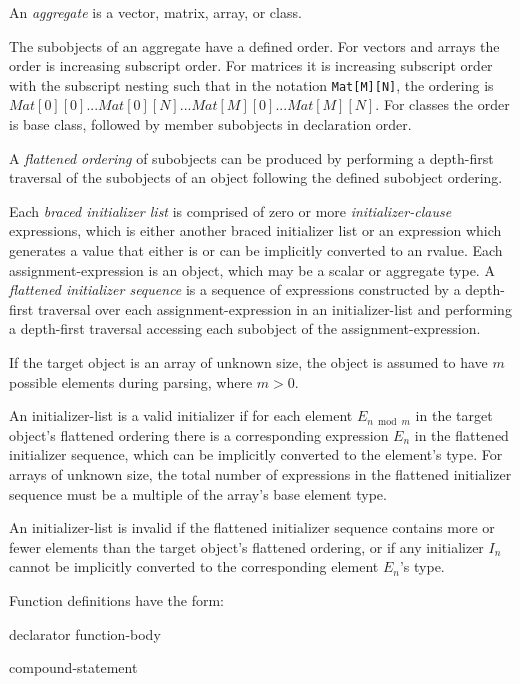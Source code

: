 
\p An \textit{aggregate} is a vector, matrix, array, or class.

\p The subobjects of an aggregate have a defined order. For vectors and arrays
the order is increasing subscript order. For matrices it is increasing subscript
order with the subscript nesting such that in the notation
\texttt{Mat[M][N]}, the ordering is \(Mat[0][0]...Mat[0][N]...
Mat[M][0]...Mat[M][N]\). For classes the order is base class, followed by member
subobjects in declaration order.

\p A \textit{flattened ordering} of subobjects can be produced by performing a
depth-first traversal of the subobjects of an object following the defined
subobject ordering.

\p Each \textit{braced initializer list} is comprised of zero or more
\textit{initializer-clause} expressions, which is either another braced
initializer list or an expression which generates a value that either is or can
be implicitly converted to an rvalue. Each assignment-expression is an object,
which may be a scalar or aggregate type. A \textit{flattened initializer
sequence} is a sequence of expressions constructed by a depth-first traversal
over each assignment-expression in an initializer-list and performing a
depth-first traversal accessing each subobject of the assignment-expression.

\p If the target object is an array of unknown size, the object is assumed to
have \(m\) possible elements during parsing, where \(m>0\).

\p An initializer-list is a valid initializer if for each element
\(E_{n \bmod m}\) in the target object's flattened ordering there is a
corresponding expression \(E_n\) in the flattened initializer sequence, which
can be implicitly converted to the element's type. For arrays of unknown size,
the total number of expressions in the flattened initializer sequence must be a
multiple of the array's base element type.

\p An initializer-list is invalid if the flattened initializer sequence contains
more or fewer elements than the target object's flattened ordering, or if any
initializer \(I_n\) cannot be implicitly converted to the corresponding element
\(E_n\)'s type.


Function definitions have the form:

\begin{grammar}
  \br
     declarator function-body

  \br
    compound-statement
\end{grammar}

